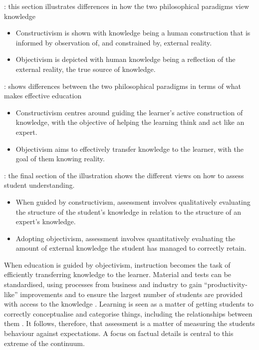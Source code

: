 \begin{description}
	\item[Epistemology]: this section illustrates differences in how the two philosophical paradigms view knowledge
	\begin{itemize}[noitemsep,nolistsep]
		\item Constructivism is shown with knowledge being a human construction that is informed by observation of, and constrained by, external reality.
		\item Objectivism is depicted with human knowledge being a reflection of the external reality, the true source of knowledge.
	\end{itemize}
	\item[Education]: shows differences between the two philosophical paradigms in terms of what makes effective education
	\begin{itemize}[noitemsep,nolistsep]
		\item Constructivism centres around guiding the learner's active construction of knowledge, with the objective of helping the learning think and act like an expert.
		\item Objectivism aims to effectively transfer knowledge to the learner, with the goal of them knowing reality.
	\end{itemize}
	\item[Assessment]: the final section of the illustration shows the different views on how to assess student understanding.
	\begin{itemize}[noitemsep,nolistsep]
		\item When guided by constructivism, assessment involves qualitatively evaluating the structure of the student's knowledge in relation to the structure of an expert's knowledge.  
		\item Adopting objectivism, assessment involves quantitatively evaluating the amount of external knowledge the student has managed to correctly retain.
	\end{itemize}
\end{description}

When education is guided by objectivism, instruction becomes the task of efficiently transferring knowledge to the learner. Material and tests can be standardised, using processes from business and industry to gain ``productivity-like'' improvements and to ensure the largest number of students are provided with access to the knowledge \cite{Tyler:1969,Vrasidas:2000}. Learning is seen as a matter of getting students to correctly conceptualise and categorise things, including the relationships between them \cite{Lakoff:1987}. It follows, therefore, that assessment is a matter of measuring the students behaviour against expectations. A focus on factual details is central to this extreme of the continuum. 

